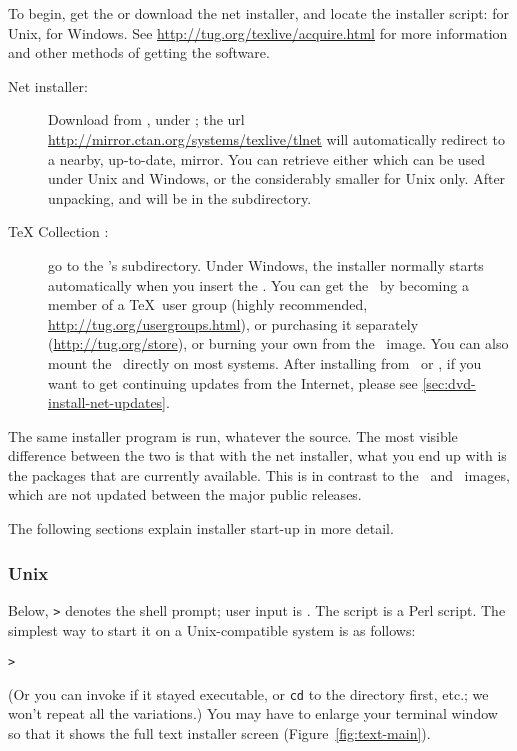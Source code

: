 \documentclass{article}
\begin{document}
To begin, get the \TK{} \DVD{} or download the \TL{} net installer, and
locate the installer script:  for Unix,
 for Windows.  See
\url{http://tug.org/texlive/acquire.html} for more information and other
methods of getting the software.

\begin{description}
\item [Net installer:] Download from \CTAN, under
; the url
\url{http://mirror.ctan.org/systems/texlive/tlnet} will automatically
redirect to a nearby, up-to-date, mirror.  You can retrieve either
 which can be used under Unix and Windows, or
the considerably smaller  for Unix
only. After unpacking,  and
 will be in the 
subdirectory.

\item [\TeX{} Collection \DVD:] go to the \DVD's 
subdirectory. Under Windows, the installer normally starts automatically
when you insert the \DVD.  You can get the \DVD\ by becoming a member of
a \TeX\ user group (highly recommended,
\url{http://tug.org/usergroups.html}), or purchasing it separately
(\url{http://tug.org/store}), or burning your own from the \ISO\ image.
You can also mount the \ISO\ directly on most systems.  After installing
from \DVD\ or \ISO, if you want to get continuing updates from the
Internet, please see \ref{sec:dvd-install-net-updates}.

\end{description}

The same installer program is run, whatever the source.  The most
visible difference between the two is that with the net installer, what
you end up with is the packages that are currently available.  This is
in contrast to the \DVD\ and \ISO\ images, which are not updated between
the major public releases.

\noindent
The following sections explain installer start-up in more detail.

\subsubsection{Unix}

Below, \texttt{>} denotes the shell prompt; user input is
.
The script  is a Perl script.  The simplest way
to start it on a Unix-compatible system is as follows:
\begin{alltt}
> 
\end{alltt}
(Or you can invoke  if it stayed
executable, or \texttt{cd} to the directory first, etc.; we won't repeat
all the variations.)  You may have to enlarge your terminal window so
that it shows the full text installer screen
(Figure~\ref{fig:text-main}).
\end{document}
